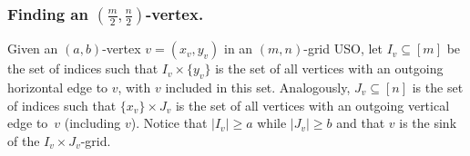\documentclass[runningheads,a4paper]{llncs}
\begin{document}
% 
% 

\vspace{-.2in}\subsubsection{Finding an $(\frac{m}{2}, \frac{n}{2})$-vertex.}

Given an $(a, b)$-vertex $v = (x_v, y_v)$ in an $(m,n)$-grid USO, let $I_v\subseteq [m]$ be the set of indices such that  $I_v \times \{y_v\}$ is the set of all vertices with an outgoing horizontal edge to $v$, with $v$ included in this set. Analogously, $J_v\subseteq [n]$ is the set of indices such that $\{x_v\}\times J_v$ is the set of all vertices with an outgoing vertical edge to~$v$ (including $v$). Notice that $|I_v| \geq a$ while $|J_v| \geq b$ and that $v$ is the sink of the $I_v\times J_v$-grid.
\end{document}
